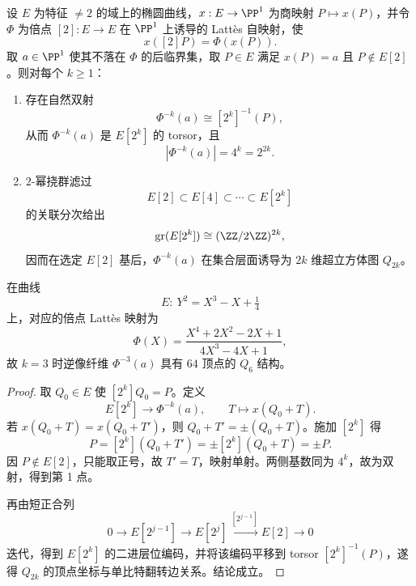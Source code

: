 \begin{theorem}\label{thm:xi-terminal-zm-lattes-preimage-hypercube-2k}
设 \(E\) 为特征 \(\neq 2\) 的域上的椭圆曲线，\(x:E\to\PP^{1}\) 为商映射 \(P\mapsto x(P)\)，并令 \(\Phi\) 为倍点 \([2]:E\to E\) 在 \(\PP^{1}\) 上诱导的 Latt\`es 自映射，使
\[
x([2]P)=\Phi(x(P)).
\]
取 \(a\in\PP^{1}\) 使其不落在 \(\Phi\) 的后临界集，取 \(P\in E\) 满足 \(x(P)=a\) 且 \(P\notin E[2]\)。则对每个 \(k\ge 1\)：
\begin{enumerate}
  \item 存在自然双射
  \[
  \Phi^{-k}(a)\cong [2^{k}]^{-1}(P),
  \]
  从而 \(\Phi^{-k}(a)\) 是 \(E[2^k]\) 的 torsor，且
  \[
  |\Phi^{-k}(a)|=4^k=2^{2k}.
  \]
  \item \(2\)-幂挠群滤过
  \[
  E[2]\subset E[4]\subset\cdots\subset E[2^k]
  \]
  的关联分次给出
  \[
  \mathrm{gr}(E[2^k])\cong(\ZZ/2\ZZ)^{2k},
  \]
  因而在选定 \(E[2]\) 基后，\(\Phi^{-k}(a)\) 在集合层面诱导为 \(2k\) 维超立方体图 \(Q_{2k}\)。
\end{enumerate}
在曲线
\[
E:\ Y^{2}=X^{3}-X+\tfrac14
\]
上，对应的倍点 Latt\`es 映射为
\[
\Phi(X)=\frac{X^{4}+2X^{2}-2X+1}{4X^{3}-4X+1},
\]
故 \(k=3\) 时逆像纤维 \(\Phi^{-3}(a)\) 具有 \(64\) 顶点的 \(Q_{6}\) 结构。
\end{theorem}
\begin{proof}
取 \(Q_0\in E\) 使 \([2^k]Q_0=P\)。定义
\[
E[2^k]\longrightarrow \Phi^{-k}(a),
\qquad
T\longmapsto x(Q_0+T).
\]
若 \(x(Q_0+T)=x(Q_0+T')\)，则 \(Q_0+T'=\pm(Q_0+T)\)。施加 \([2^k]\) 得
\[
P=[2^k](Q_0+T')=\pm[2^k](Q_0+T)=\pm P.
\]
因 \(P\notin E[2]\)，只能取正号，故 \(T'=T\)，映射单射。两侧基数同为 \(4^k\)，故为双射，得到第 1 点。

再由短正合列
\[
0\to E[2^{j-1}]\to E[2^j]\xrightarrow{[2^{j-1}]}E[2]\to 0
\]
迭代，得到 \(E[2^k]\) 的二进层位编码，并将该编码平移到 torsor \([2^k]^{-1}(P)\)，遂得 \(Q_{2k}\) 的顶点坐标与单比特翻转边关系。结论成立。
\end{proof}


